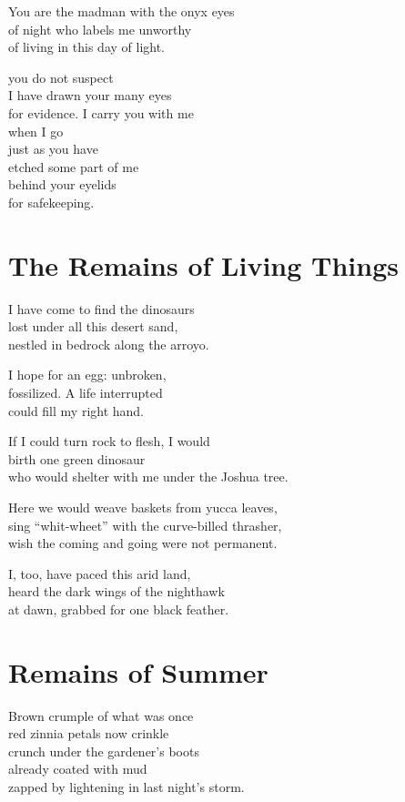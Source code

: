 \documentclass[twoside,10pt]{book}
\begin{document}
You are the madman with the onyx eyes\\
of night who labels me unworthy\\
of living in this day of light.

you do not suspect\\
I have drawn your many eyes\\
for evidence. I carry you with me\\
when I go\\
just as you have\\
etched some part of me\\
behind your eyelids\\
for safekeeping.


\clearpage
\section{The Remains of Living Things}

I have come to find the dinosaurs\\
lost under all this desert sand,\\
nestled in bedrock along the arroyo.

I hope for an egg: unbroken,\\
fossilized. A life interrupted\\
could fill my right hand.

If I could turn rock to flesh, I would\\
birth one green dinosaur\\
who would shelter with me under the Joshua tree.

Here we would weave baskets from yucca leaves,\\
sing ``whit-wheet'' with the curve-billed thrasher,\\
wish the coming and going were not permanent.

I, too, have paced this arid land,\\
heard the dark wings of the nighthawk\\
at dawn, grabbed for one black feather.


\clearpage
\section{Remains of Summer}

Brown crumple of what was once\\
red zinnia petals now crinkle\\
crunch under the gardener's boots\\
already coated with mud\\
zapped by lightening in last night's storm.
\end{document}
